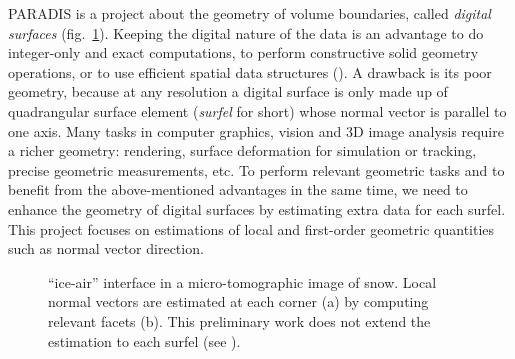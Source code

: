 

PARADIS is a project about the geometry of volume boundaries,
called \emph{digital surfaces} (fig.~\ref{fig:snow}). 
Keeping the digital nature of the data is an advantage
to do integer-only and exact computations,
to perform constructive solid geometry operations,
or to use efficient spatial data structures
(\eg \cite{kampe2013sg,Villanueva:2016:SSS:2856400.2856420,JaspeVillanueva2017SSVDAG}).
A drawback is its poor geometry, because at any resolution a digital surface is only 
made up of quadrangular surface element (\emph{surfel} for short) 
whose normal vector is parallel to one axis. 
Many tasks in computer graphics, vision and 3D image analysis require a richer geometry: 
rendering, surface deformation for simulation or tracking, precise geometric measurements, etc.
To perform relevant geometric tasks and 
to benefit from the above-mentioned advantages in the same time, 
we need to enhance the geometry of digital surfaces by estimating extra data for each surfel. 
This project focuses on estimations of local and first-order geometric quantities
such as normal vector direction.

\begin{figure}[hb]
  \centering
%
%
%
%
%
\caption{``ice-air'' interface in a micro-tomographic image of
  snow\protect\footnotemark. Local normal vectors are estimated
  at each corner (a) by computing relevant facets (b). This
  preliminary work does not extend the estimation to each surfel
  (see ). } 
\label{fig:snow} 
\end{figure}

